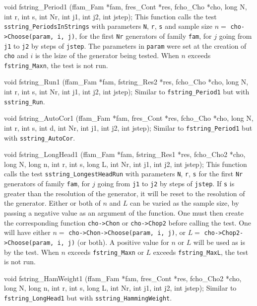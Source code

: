 void fstring_Period1 (ffam_Fam *fam, fres_Cont *res, fcho_Cho *cho,
                      long N, int r, int s,
                      int Nr, int j1, int j2, int jstep);
\endcode
\tab
 This function calls the test {\tt sstring\_PeriodsInStrings} with
 parameters {\tt N}, {\tt r}, {\tt s} and sample size
 $n =$ {\tt cho->Choose(param, i, j)},
 for the first {\tt Nr} generators of family {\tt fam}, for $j$ going from
 {\tt j1} to {\tt j2} by steps of {\tt jstep}. The parameters in {\tt param}
 were set at the creation of {\tt cho} and $i$ is the lsize of the
 generator being tested.
 When $n$ exceeds {\tt fstring\_Maxn}, the test is not run.
\endtab
\code


void fstring_Run1 (ffam_Fam *fam, fstring_Res2 *res, fcho_Cho *cho,
                   long N, int r, int s,
                   int Nr, int j1, int j2, int jstep);
\endcode
  \tab Similar to {\tt fstring\_Period1} but with
 {\tt sstring\_Run}.
 \endtab
\code


void fstring_AutoCor1 (ffam_Fam *fam, fres_Cont *res, fcho_Cho *cho,
                       long N, int r, int s, int d,
                       int Nr, int j1, int j2, int jstep);
\endcode
  \tab Similar to {\tt fstring\_Period1} but with
 {\tt sstring\_AutoCor}.
 \endtab
\code


void fstring_LongHead1 (ffam_Fam *fam, fstring_Res1 *res, fcho_Cho2 *cho,
                        long N, long n, int r, int s, long L,
                        int Nr, int j1, int j2, int jstep);
\endcode
  \tab This function calls the test {\tt sstring\_LongestHeadRun} with
  parameters {\tt N}, {\tt r}, {\tt s} for the first {\tt Nr} generators of
 family {\tt fam}, for $j$ going from {\tt j1} to {\tt j2} by steps of
 {\tt jstep}.  If {\tt s} is greater than the resolution of the
  generator, it will be reset to the resolution of the
  generator. Either or both of $n$ and $L$ can be varied as
 the sample size, by passing a negative value as an argument of the
 function. One must then create the corresponding function
 {\tt cho->Chon} or {\tt cho->Chop2} before calling the test.
 One will have either $n = {}$ {\tt cho->Chon->Choose(param, i, j)},
 or $L = {}$ {\tt cho->Chop2->Choose(param, i, j)} (or both). A positive value
 for $n$ or $L$ will be used as is by the test.
 When $n$ exceeds {\tt fstring\_Maxn} or  $L$ exceeds {\tt fstring\_MaxL},
  the test is not run.
 \endtab
\code


void fstring_HamWeight1 (ffam_Fam *fam, fres_Cont *res, fcho_Cho2 *cho,
                         long N, long n, int r, int s, long L,
                         int Nr, int j1, int j2, int jstep);
\endcode
  \tab Similar to {\tt fstring\_LongHead1} but with
 {\tt sstring\_HammingWeight}.
 \endtab
\code


